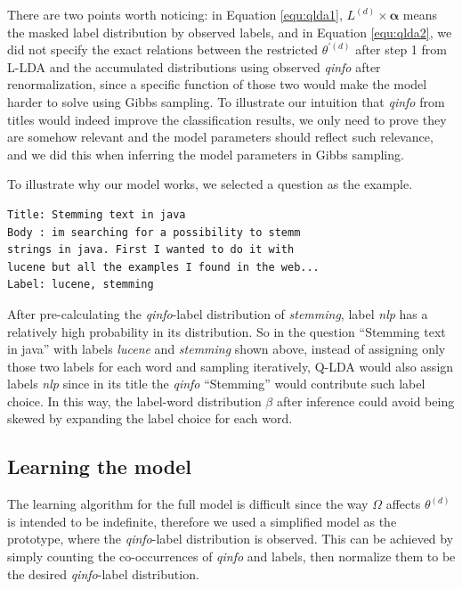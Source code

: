 There are two points worth noticing: in Equation \ref{equ:qlda1}, $L^{(d)} \times \boldsymbol{\alpha}$ means the masked label distribution by observed labels, and in Equation \ref{equ:qlda2}, we did not specify the exact relations between the restricted $\theta^{\prime(d)}$ after step 1 from L-LDA and the accumulated distributions using observed \emph{qinfo} after renormalization, since a specific function of those two would make the model harder to solve using Gibbs sampling. To illustrate our intuition that \emph{qinfo} from titles would indeed improve the classification results, we only need to prove they are somehow relevant and the model parameters should reflect such relevance, and we did this when inferring the model parameters in Gibbs sampling.

To illustrate why our model works, we selected a question as the example. 

{\small 
    \begin{verbatim}
Title: Stemming text in java
Body : im searching for a possibility to stemm
strings in java. First I wanted to do it with 
lucene but all the examples I found in the web...
Label: lucene, stemming
    \end{verbatim}
}

After pre-calculating the \emph{qinfo}-label distribution of \emph{stemming}, label \emph{nlp} has a relatively high probability in its distribution. So in the question ``Stemming text in java'' with labels \emph{lucene} and \emph{stemming} shown above, instead of assigning only those two labels for each word and sampling iteratively, Q-LDA would also assign labels \emph{nlp} since in its title the \emph{qinfo} ``Stemming'' would contribute such label choice. In this way, the label-word distribution $\beta$ after inference could avoid being skewed by expanding the label choice for each word.

\subsection{Learning the model}
\label{subsec:learn}

The learning algorithm for the full model is difficult since the way $\Omega$ affects $\theta^{(d)}$ is intended to be indefinite, therefore we used a simplified model as the prototype, where the \emph{qinfo}-label distribution is observed. This can be achieved by simply counting the co-occurrences of \emph{qinfo} and labels, then normalize them to be the desired \emph{qinfo}-label distribution. 

